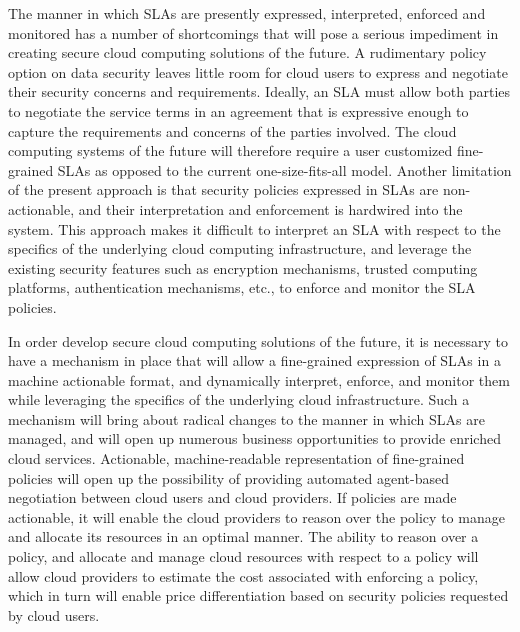 \documentclass[times, 10pt,twocolumn]{article}
\begin{document}
The manner in which SLAs are presently expressed, interpreted, enforced and monitored has a number of shortcomings that will pose a serious impediment in creating secure cloud computing solutions of the future.  A  rudimentary policy option on data security leaves little room for cloud users to express and negotiate their security concerns and requirements. Ideally, an SLA must allow both parties to negotiate the service terms in an agreement that is expressive enough to capture the requirements and concerns of the parties involved. The cloud computing systems of the future will therefore require a user customized fine-grained SLAs as opposed to the current one-size-fits-all model. Another limitation of the present approach is that security policies expressed in SLAs are non-actionable, and their interpretation and enforcement is hardwired into the system. This approach makes it difficult to interpret an SLA with respect to the specifics of the underlying cloud computing infrastructure, and leverage the existing security features such as encryption mechanisms, trusted computing platforms, authentication mechanisms, etc., to enforce and monitor the SLA policies. 

In order develop secure cloud computing solutions of the future, it is necessary to have a mechanism in place that will allow a fine-grained expression of SLAs in a machine actionable format, and dynamically interpret, enforce, and monitor them while leveraging the specifics of the underlying cloud infrastructure. Such a mechanism will bring about radical changes to the manner in which SLAs are managed, and will open up numerous business opportunities to provide enriched cloud services. Actionable, machine-readable representation of fine-grained policies will open up the possibility of providing automated agent-based negotiation between cloud users and cloud providers. If policies are made actionable, it will enable the cloud providers to reason over the policy to manage and allocate its resources in an optimal manner. The ability to reason over a policy, and allocate and manage cloud resources with respect to a policy will allow cloud providers to estimate the cost associated with enforcing a policy, which in turn will enable price differentiation based on security policies requested by cloud users.
 
\end{document}
